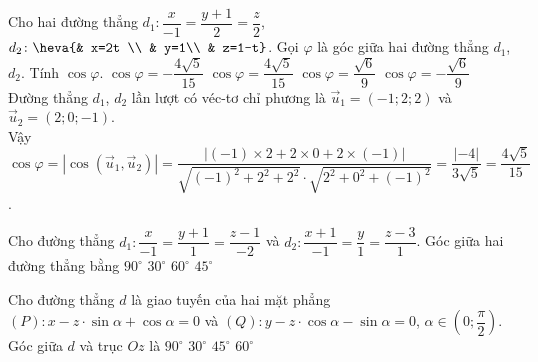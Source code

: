\begin{ex}
	Cho hai đường thẳng $d_1\colon \dfrac{x}{-1}=\dfrac{y+1}{2}=\dfrac{z}{2}$, $d_2\colon\heva{& x=2t \\ & y=1\\ & z=1-t}$. Gọi $\varphi$ là góc
	giữa hai đường thẳng $d_1$, $d_2$. Tính $\cos\varphi$.
	\choice
	{$\cos \varphi=-\dfrac{4\sqrt{5}}{15}$}
	{\True $\cos \varphi=\dfrac{4\sqrt{5}}{15}$}
	{$\cos \varphi=\dfrac{\sqrt{6}}{9}$}
	{$\cos \varphi=-\dfrac{\sqrt{6}}{9}$}
	\loigiai
	{Đường thẳng $d_1$, $d_2$ lần lượt có véc-tơ chỉ phương là $\overrightarrow{u}_1=(-1; 2; 2)$ và $\overrightarrow{u}_2=(2; 0; -1)$.\\
		Vậy $\cos\varphi=\left|\cos\left(\overrightarrow{u}_1, \overrightarrow{u}_2\right)\right|=\dfrac{|(-1)\times 2 +2\times 0+ 2\times(-1)|}{\sqrt{(-1)^2+2^2+2^2}\cdot\sqrt{2^2+0^2+(-1)^2}}=\dfrac{|-4|}{3\sqrt{5}}=\dfrac{4\sqrt{5}}{15}$.
	}
\end{ex}
\begin{ex}%
	Cho đường thẳng $d_1\colon \dfrac{x}{-1}=\dfrac{y+1}{1}=\dfrac{z-1}{-2}$ và $d_2\colon \dfrac{x+1}{-1}=\dfrac{y}{1}=\dfrac{z-3}{1}$. Góc giữa hai đường thẳng bằng
	\choice
	{\True $90^\circ$}
	{$30^\circ$}
	{$60^\circ$}
	{$45^\circ$}
\end{ex}
\begin{ex}
	Cho đường thẳng $d$ là giao tuyến của hai mặt phẳng\\ $(P) \colon x-z \cdot \sin \alpha +\cos \alpha =0$ và $(Q) \colon y-z \cdot \cos \alpha -\sin \alpha =0$, $\alpha \in \left(0;\dfrac{\pi}{2}\right)$. Góc giữa $d$ và trục $Oz$ là
	\choice
	{$90^{\circ}$}
	{$30^{\circ}$}
	{\True $45^{\circ}$}
	{$60^{\circ}$}
\end{ex}

